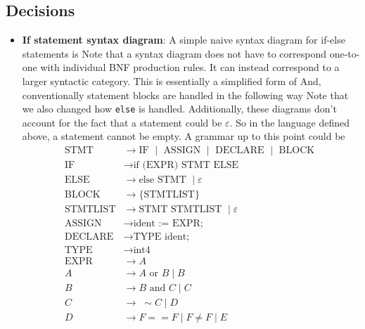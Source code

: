 \documentclass{report}
\begin{document}
    \subsection{Decisions}
    \begin{itemize}
        \item \textbf{If statement syntax diagram}: A simple naive syntax diagram for if-else statements is
            \bigbreak \noindent 
            \bigbreak \noindent 
            Note that a syntax diagram does not have to correspond one-to-one with individual BNF production rules. It can instead correspond to a larger syntactic category. This is essentially a simplified form of
            \bigbreak \noindent 
            \bigbreak \noindent 
            And, conventionally statement blocks are handled in the following way
            \bigbreak \noindent 
            \bigbreak \noindent 
            Note that we also changed how \texttt{else} is handled. Additionally, these diagrams don't account for the fact that a statement could be $\varepsilon$. So in the language defined above, a statement cannot be empty.
            \bigbreak \noindent 
            A grammar up to this point could be 
            \begin{align*}
                \text{STMT} &\to \text{IF } \mid \text{ ASSIGN } \mid \text{ DECLARE } \mid \text{ BLOCK }\\
                \text{IF} &\to  \text{if (EXPR) STMT ELSE } \\
                \text{ELSE} &\to \text{else STMT } \mid \varepsilon\\
                \text{BLOCK} &\to \{\text{STMTLIST}\} \\
                \text{STMTLIST} &\to \text{STMT STMTLIST } \mid \varepsilon \\
                \text{ASSIGN} &\to  \text{ident := EXPR; }\\
                \text{DECLARE} &\to \text{TYPE ident; } \\
                \text{TYPE} &\to \text{int4} \\
                \text{EXPR} &\to  A \\
                A &\to A \text{ or } B \mid B\\
                B &\to B \text{ and } C \mid C\\
                C &\to\; \sim C \mid D \\
                D &\to F == F \mid F \ne F \mid E\\

\end{align*}
\end{itemize}
\end{document}
